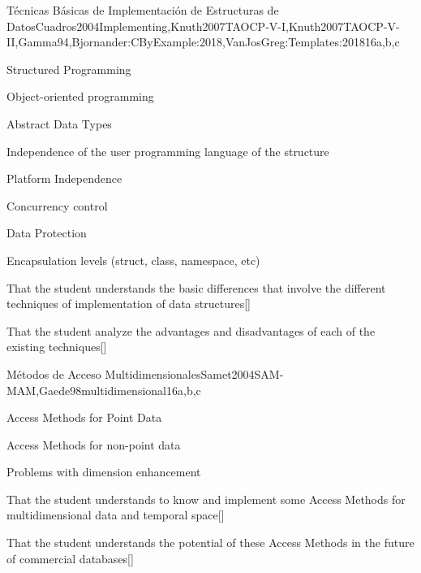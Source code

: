 \begin{syllabus}
\begin{unit}{Técnicas Básicas de Implementación de Estructuras de Datos}{}{Cuadros2004Implementing,Knuth2007TAOCP-V-I,Knuth2007TAOCP-V-II,Gamma94,Bjornander:CByExample:2018,VanJosGreg:Templates:2018}{16}{a,b,c}
   \begin{topics}
         \item Structured Programming
         \item Object-oriented programming
         \item Abstract Data Types
         \item Independence of the user programming language of the structure
         \item Platform Independence
         \item Concurrency control
         \item Data Protection
         \item Encapsulation levels (struct, class, namespace, etc)
   \end{topics}
   \begin{learningoutcomes}
         \item That the student understands the basic differences that involve the different techniques of implementation of data structures[\Usage]
         \item That the student analyze the advantages and disadvantages of each of the existing techniques[\Usage]
   \end{learningoutcomes}
\end{unit}

\begin{unit}{Métodos de Acceso Multidimensionales}{}{Samet2004SAM-MAM,Gaede98multidimensional}{16}{a,b,c}
   \begin{topics}
         \item Access Methods for Point Data
         \item Access Methods for non-point data
         \item Problems with dimension enhancement
   \end{topics}
   \begin{learningoutcomes}
         \item That the student understands to know and implement some Access Methods for multidimensional data and temporal space[\Usage]
         \item That the student understands the potential of these Access Methods in the future of commercial databases[\Usage]
   \end{learningoutcomes}
\end{unit}


\end{syllabus}
